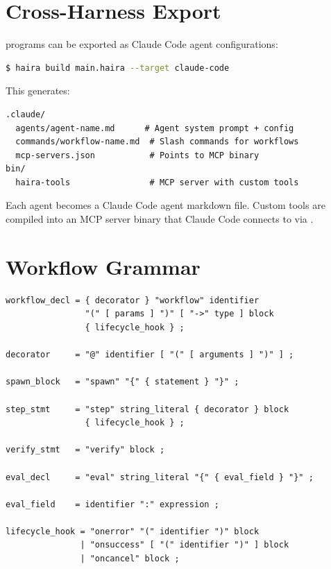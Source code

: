 \section{Cross-Harness Export}

\haira{} programs can be exported as Claude Code agent configurations:

\begin{lstlisting}[language=bash,numbers=none]
$ haira build main.haira --target claude-code
\end{lstlisting}

This generates:

\begin{lstlisting}[language={},numbers=none]
.claude/
  agents/agent-name.md      # Agent system prompt + config
  commands/workflow-name.md  # Slash commands for workflows
  mcp-servers.json           # Points to MCP binary
bin/
  haira-tools                # MCP server with custom tools
\end{lstlisting}

Each agent becomes a Claude Code agent markdown file. Custom tools are compiled into an MCP server binary that Claude Code connects to via .

\section{Workflow Grammar}

\begin{lstlisting}[language=EBNF]
workflow_decl = { decorator } "workflow" identifier
                "(" [ params ] ")" [ "->" type ] block
                { lifecycle_hook } ;

decorator     = "@" identifier [ "(" [ arguments ] ")" ] ;

spawn_block   = "spawn" "{" { statement } "}" ;

step_stmt     = "step" string_literal { decorator } block
                { lifecycle_hook } ;

verify_stmt   = "verify" block ;

eval_decl     = "eval" string_literal "{" { eval_field } "}" ;

eval_field    = identifier ":" expression ;

lifecycle_hook = "onerror" "(" identifier ")" block
               | "onsuccess" [ "(" identifier ")" ] block
               | "oncancel" block ;
\end{lstlisting}
